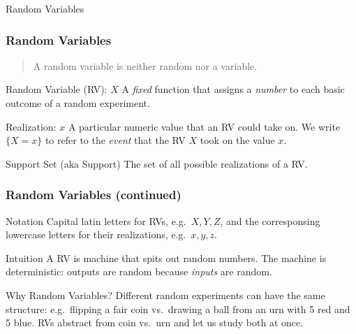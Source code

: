 \begin{frame}
  \begin{center}
  \Huge Random Variables
  \end{center}
\end{frame}
\def\RVraw{(-2.5,0) circle [radius=1.7]
	(-2.5,0) circle [radius=1.7]
	(2.5,0) circle [radius=1.7]
	node [above left] at (-3.75,1.25) {$S$}
	node [above right] at (3.75,1.25) {$\mathbb{R}$}
}
\begin{frame}
  \frametitle{Random Variables}
  \begin{quote}
    A random variable is neither random nor a variable.
  \end{quote}
\begin{block}{Random Variable (RV): $X$}
  A \emph{fixed} function that assigns a \emph{number} to each basic outcome of a random experiment.
\end{block}
 
\begin{block}{Realization: $x$}
A particular numeric value that an RV could take on. We write $\{X = x\}$ to refer to the \emph{event} that the RV $X$ took on the value $x$.  
\end{block}
 
\begin{block}{Support Set (aka Support)}
The set of all possible realizations of a RV.
\end{block}
 
\end{frame}
\begin{frame}
  \frametitle{Random Variables (continued)}
\begin{block}{Notation}
Capital latin letters for RVs, e.g.\ $X,Y,Z$, and the corresponsing lowercase letters for their realizations, e.g.\ $x,y,z$.
\end{block}

\begin{block}{Intuition}
  A RV is machine that spits out random numbers. The machine is deterministic: outputs are random because \emph{inputs} are random.
\end{block}

\begin{alertblock}{Why Random Variables?}
Different random experiments can have the same structure: e.g.\ flipping a fair coin vs.\ drawing a ball from an urn with 5 red and 5 blue. 
RVs abstract from coin vs.\ urn and let us study both at once.
\end{alertblock}
\end{frame}
